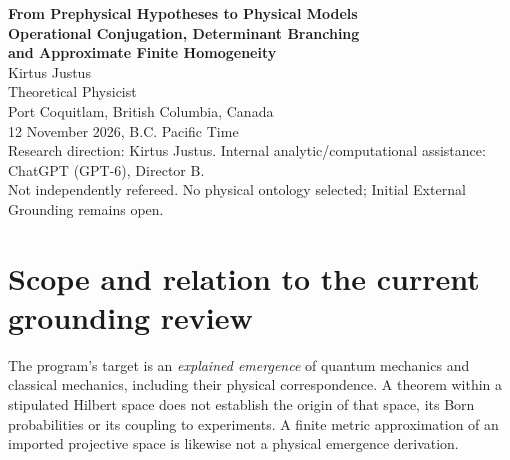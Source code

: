 \documentclass[11pt,a4paper]{article}
\newcommand{\CP}{\mathbb{CP}}
\begin{document}
\begin{center}
{\large\bfseries From Prephysical Hypotheses to Physical Models}\\[7pt]
{\Large\bfseries Operational Conjugation, Determinant Branching\\[2pt] and Approximate Finite Homogeneity}\\[9pt]
{\large Kirtus Justus}\\
Theoretical Physicist\\
Port Coquitlam, British Columbia, Canada\\[6pt]
12 November 2026, B.C. Pacific Time\\[6pt]
{\footnotesize Research direction: Kirtus Justus. Internal analytic/computational assistance: ChatGPT (GPT-6), Director B.\\
Not independently refereed. No physical ontology selected; Initial External Grounding remains open.}
\end{center}
\begin{abstract}
The transition-probability geometry and holonomy identities used in current foundational-physics reconstruction proposals are examined at three selection boundaries. First, simultaneous complex conjugation of every preparation and adaptive quantum instrument leaves every finite operational record probability exactly invariant. An absolute oriented complex-structure sign may consequently be a representation choice, whereas conjugation relative to an unchanged physical reference is detectable. Second, for each $n\ge 2$ there are two ordered three-ray configurations in $\CP^n$ with the same three transition probabilities and the same complex tangent determinant holonomy, but inequivalent Bargmann phases even modulo conjugation. Third, arbitrary finite nets of a homogeneous compact metric space exhibit correspondence-based approximate transitivity with distortion tending to zero, although exact finite-stage homogeneity may be obstructed by Gelander's theorem. These are mathematical results inside stated structures. They do not supply a prephysical origin of probabilities, composition, dynamics, clocks, classical mechanics or empirical identification.
\end{abstract}

\section{Scope and relation to the current grounding review}
The program's target is an \emph{explained emergence} of quantum mechanics and classical mechanics, including their physical correspondence. A theorem within a stipulated Hilbert space does not establish the origin of that space, its Born probabilities or its coupling to experiments. A finite metric approximation of an imported projective space is likewise not a physical emergence derivation.
\end{document}
